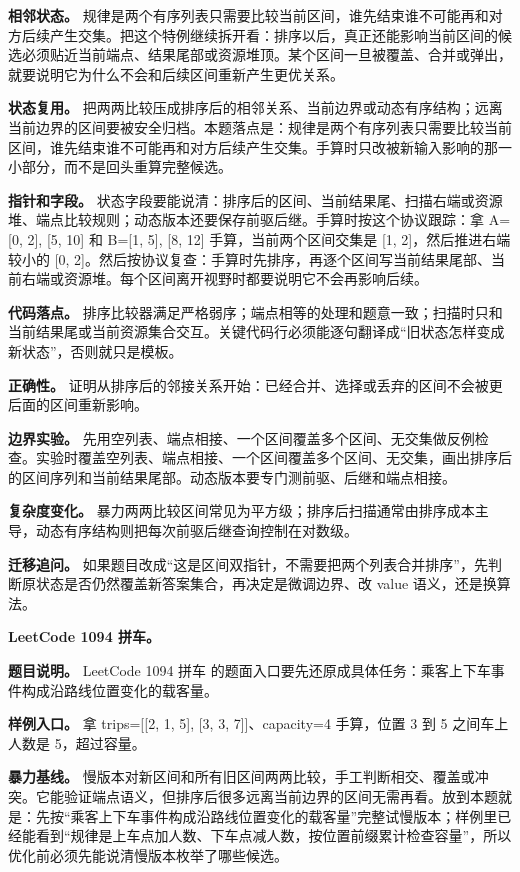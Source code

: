 \textbf{相邻状态。} 规律是两个有序列表只需要比较当前区间，谁先结束谁不可能再和对方后续产生交集。把这个特例继续拆开看：排序以后，真正还能影响当前区间的候选必须贴近当前端点、结果尾部或资源堆顶。某个区间一旦被覆盖、合并或弹出，就要说明它为什么不会和后续区间重新产生更优关系。

\textbf{状态复用。} 把两两比较压成排序后的相邻关系、当前边界或动态有序结构；远离当前边界的区间要被安全归档。本题落点是：规律是两个有序列表只需要比较当前区间，谁先结束谁不可能再和对方后续产生交集。手算时只改被新输入影响的那一小部分，而不是回头重算完整候选。

\textbf{指针和字段。} 状态字段要能说清：排序后的区间、当前结果尾、扫描右端或资源堆、端点比较规则；动态版本还要保存前驱后继。手算时按这个协议跟踪：拿 A=[0, 2], [5, 10] 和 B=[1, 5], [8, 12] 手算，当前两个区间交集是 [1, 2]，然后推进右端较小的 [0, 2]。然后按协议复查：手算时先排序，再逐个区间写当前结果尾部、当前右端或资源堆。每个区间离开视野时都要说明它不会再影响后续。

\textbf{代码落点。} 排序比较器满足严格弱序；端点相等的处理和题意一致；扫描时只和当前结果尾或当前资源集合交互。关键代码行必须能逐句翻译成“旧状态怎样变成新状态”，否则就只是模板。

\textbf{正确性。} 证明从排序后的邻接关系开始：已经合并、选择或丢弃的区间不会被更后面的区间重新影响。

\textbf{边界实验。} 先用空列表、端点相接、一个区间覆盖多个区间、无交集做反例检查。实验时覆盖空列表、端点相接、一个区间覆盖多个区间、无交集，画出排序后的区间序列和当前结果尾部。动态版本要专门测前驱、后继和端点相接。

\textbf{复杂度变化。} 暴力两两比较区间常见为平方级；排序后扫描通常由排序成本主导，动态有序结构则把每次前驱后继查询控制在对数级。

\textbf{迁移追问。} 如果题目改成“这是区间双指针，不需要把两个列表合并排序”，先判断原状态是否仍然覆盖新答案集合，再决定是微调边界、改 value 语义，还是换算法。

\noindent\textbf{LeetCode 1094 拼车。}

\textbf{题目说明。} LeetCode 1094 拼车 的题面入口要先还原成具体任务：乘客上下车事件构成沿路线位置变化的载客量。

\textbf{样例入口。} 拿 trips=[[2, 1, 5], [3, 3, 7]]、capacity=4 手算，位置 3 到 5 之间车上人数是 5，超过容量。

\textbf{暴力基线。} 慢版本对新区间和所有旧区间两两比较，手工判断相交、覆盖或冲突。它能验证端点语义，但排序后很多远离当前边界的区间无需再看。放到本题就是：先按“乘客上下车事件构成沿路线位置变化的载客量”完整试慢版本；样例里已经能看到“规律是上车点加人数、下车点减人数，按位置前缀累计检查容量”，所以优化前必须先能说清慢版本枚举了哪些候选。

